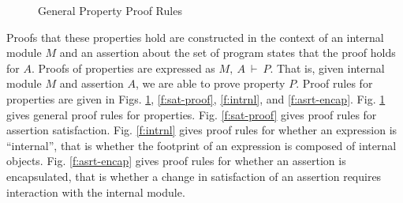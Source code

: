 \documentclass[acmsmall,review,anonymous]{acmart}\settopmatter{printfolios=true,printccs=false,printacmref=false}
\begin{document}
\begin{figure}[t]
\caption{General Property Proof Rules}
\label{f:prop-proof}
\end{figure}
Proofs that these properties hold are constructed in the context of
an internal module $M$ and an assertion about the set of program states that the proof holds for $A$.
Proofs of properties are expressed as $M,\ A\ \vdash\ P$. That is, given 
internal module $M$ and assertion $A$, we are able to prove property $P$.
Proof rules for properties are given in Figs. \ref{f:prop-proof}, \ref{f:sat-proof},
\ref{f:intrnl}, and \ref{f:asrt-encap}.
Fig. \ref{f:prop-proof} gives general proof rules for properties.
Fig. \ref{f:sat-proof} gives proof rules for assertion satisfaction.
Fig. \ref{f:intrnl} gives proof rules for whether an expression is ``internal'', that is whether the footprint of an expression 
is composed of internal objects.
Fig. \ref{f:asrt-encap} gives proof rules for whether an assertion is encapsulated, that is whether 
a change in satisfaction of an assertion requires interaction with the internal module.
\end{document}
